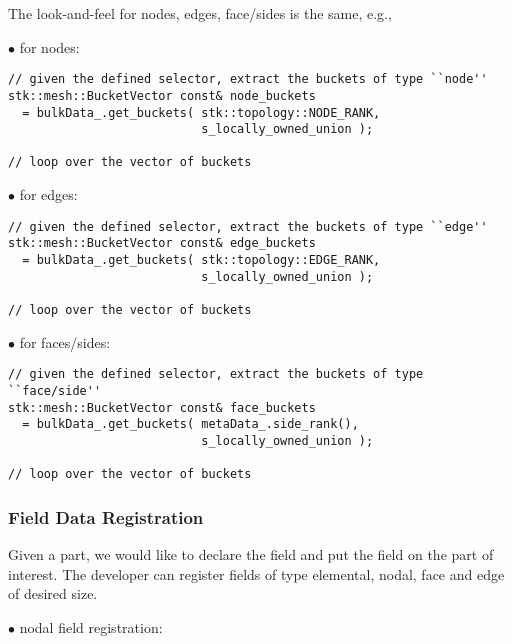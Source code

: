 The look-and-feel for nodes, edges, face/sides is the same, e.g.,

\begin{description}
\item[$\bullet$ for nodes:]
\end{description}

\begin{lstlisting}
// given the defined selector, extract the buckets of type ``node''
stk::mesh::BucketVector const& node_buckets 
  = bulkData_.get_buckets( stk::topology::NODE_RANK, 
                           s_locally_owned_union );

// loop over the vector of buckets 
\end{lstlisting}

\begin{description}
\item[$\bullet$ for edges:]
\end{description}

\begin{lstlisting}
// given the defined selector, extract the buckets of type ``edge''
stk::mesh::BucketVector const& edge_buckets 
  = bulkData_.get_buckets( stk::topology::EDGE_RANK, 
                           s_locally_owned_union );

// loop over the vector of buckets 
\end{lstlisting}


\begin{description}
\item[$\bullet$ for faces/sides:]
\end{description}

\begin{lstlisting}
// given the defined selector, extract the buckets of type ``face/side''
stk::mesh::BucketVector const& face_buckets 
  = bulkData_.get_buckets( metaData_.side_rank(), 
                           s_locally_owned_union );

// loop over the vector of buckets 
\end{lstlisting}


\subsubsection{Field Data Registration}
Given a part, we would like to declare the field and put the field on the part of interest.
The developer can register fields of type elemental, nodal, face and edge of desired size. 

\begin{description}
\item[$\bullet$ nodal field registration:]
\end{description}

